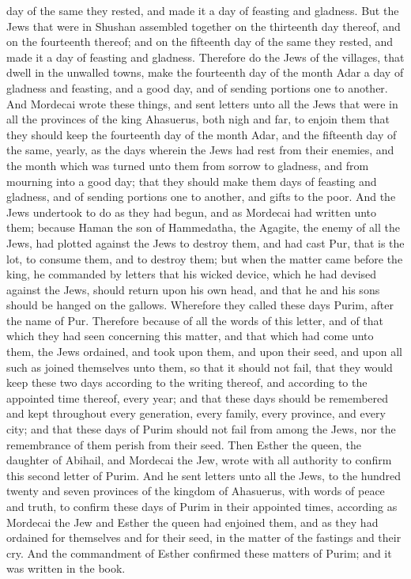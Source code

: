day of the same they rested, and made it a day of feasting and gladness. But the Jews that were in Shushan assembled together on the thirteenth day thereof, and on the fourteenth thereof; and on the fifteenth day of the same they rested, and made it a day of feasting and gladness. Therefore do the Jews of the villages, that dwell in the unwalled towns, make the fourteenth day of the month Adar a day of gladness and feasting, and a good day, and of sending portions one to another.  And Mordecai wrote these things, and sent letters unto all the Jews that were in all the provinces of the king Ahasuerus, both nigh and far, to enjoin them that they should keep the fourteenth day of the month Adar, and the fifteenth day of the same, yearly, as the days wherein the Jews had rest from their enemies, and the month which was turned unto them from sorrow to gladness, and from mourning into a good day; that they should make them days of feasting and gladness, and of sending portions one to another, and gifts to the poor. And the Jews undertook to do as they had begun, and as Mordecai had written unto them; because Haman the son of Hammedatha, the Agagite, the enemy of all the Jews, had plotted against the Jews to destroy them, and had cast Pur, that is the lot, to consume them, and to destroy them; but when the matter came before the king, he commanded by letters that his wicked device, which he had devised against the Jews, should return upon his own head, and that he and his sons should be hanged on the gallows.  Wherefore they called these days Purim, after the name of Pur. Therefore because of all the words of this letter, and of that which they had seen concerning this matter, and that which had come unto them, the Jews ordained, and took upon them, and upon their seed, and upon all such as joined themselves unto them, so that it should not fail, that they would keep these two days according to the writing thereof, and according to the appointed time thereof, every year; and that these days should be remembered and kept throughout every generation, every family, every province, and every city; and that these days of Purim should not fail from among the Jews, nor the remembrance of them perish from their seed.  Then Esther the queen, the daughter of Abihail, and Mordecai the Jew, wrote with all authority to confirm this second letter of Purim. And he sent letters unto all the Jews, to the hundred twenty and seven provinces of the kingdom of Ahasuerus, with words of peace and truth, to confirm these days of Purim in their appointed times, according as Mordecai the Jew and Esther the queen had enjoined them, and as they had ordained for themselves and for their seed, in the matter of the fastings and their cry. And the commandment of Esther confirmed these matters of Purim; and it was written in the book. 

